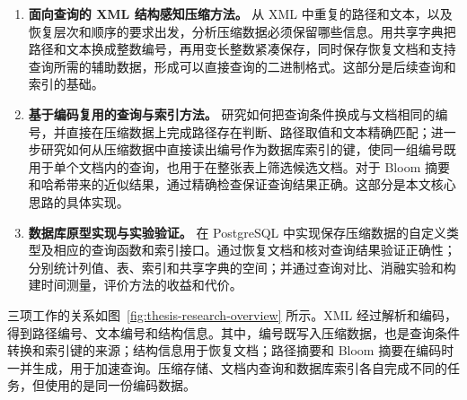\begin{enumerate}[label=（\arabic*）]
\item \textbf{面向查询的 XML 结构感知压缩方法。} 从 XML 中重复的路径和文本，以及恢复层次和顺序的要求出发，分析压缩数据必须保留哪些信息。用共享字典把路径和文本换成整数编号，再用变长整数紧凑保存，同时保存恢复文档和支持查询所需的辅助数据，形成可以直接查询的二进制格式。这部分是后续查询和索引的基础。
\item \textbf{基于编码复用的查询与索引方法。} 研究如何把查询条件换成与文档相同的编号，并直接在压缩数据上完成路径存在判断、路径取值和文本精确匹配；进一步研究如何从压缩数据中直接读出编号作为数据库索引的键，使同一组编号既用于单个文档内的查询，也用于在整张表上筛选候选文档。对于 Bloom 摘要和哈希带来的近似结果，通过精确检查保证查询结果正确。这部分是本文核心思路的具体实现。
\item \textbf{数据库原型实现与实验验证。} 在 PostgreSQL 中实现保存压缩数据的自定义类型及相应的查询函数和索引接口。通过恢复文档和核对查询结果验证正确性；分别统计列值、表、索引和共享字典的空间；并通过查询对比、消融实验和构建时间测量，评价方法的收益和代价。
\end{enumerate}

三项工作的关系如图~\ref{fig:thesis-research-overview} 所示。XML 经过解析和编码，得到路径编号、文本编号和结构信息。其中，编号既写入压缩数据，也是查询条件转换和索引键的来源；结构信息用于恢复文档；路径摘要和 Bloom 摘要在编码时一并生成，用于加速查询。压缩存储、文档内查询和数据库索引各自完成不同的任务，但使用的是同一份编码数据。

